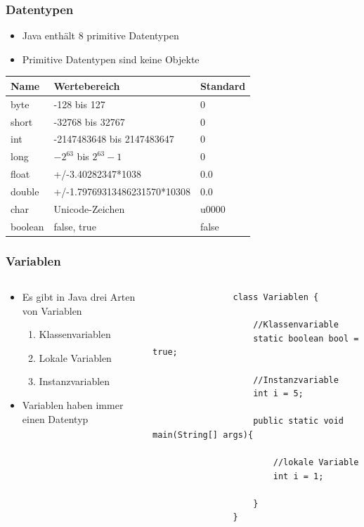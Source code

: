 \begin{frame}[fragile]
	\frametitle{Datentypen}
	\small
	\begin{itemize}
	  \item Java enth\"alt 8 primitive Datentypen
	  \item Primitive Datentypen sind keine Objekte
	\end{itemize}
	\begin{table}
	\begin{tabular}{l|l|l}
	Name & Wertebereich & Standard\\ \hline
	byte  & -128 bis 127 & 0 \\ 
	short & -32768 bis 32767 & 0 \\
			int & -2147483648 bis 2147483647 & 0 \\
			long & $-2^{63}$ bis $2^{63}-1$ & 0 \\
			float & +/-3.40282347*1038 & 0.0 \\
			double & +/-1.79769313486231570*10308 & 0.0 \\
			char & Unicode-Zeichen & u0000 \\
			boolean& false, true & false \\
	\end{tabular}
	\end{table}
	\normalsize
\end{frame}

\begin{frame}[fragile]
	\frametitle{Variablen}
	\begin{columns}
		\begin{column}{0.5\textwidth}
			\small
			\begin{itemize}
				\item Es gibt in Java drei Arten von Variablen
					\begin{enumerate}
					  \item Klassenvariablen
					  \item Lokale Variablen
					  \item Instanzvariablen
					\end{enumerate}
				\item Variablen haben immer einen Datentyp
			\end{itemize}
		\end{column}
		\begin{column}{0.5\textwidth}
			\begin{lstlisting}
				class Variablen {
					
					//Klassenvariable
					static boolean bool = true; 
					
					//Instanzvariable
					int i = 5; 
					
					public static void main(String[] args){ 
						
						//lokale Variable
						int i = 1;
						
					}
				}
			\end{lstlisting}
		\end{column}
	\end{columns}
\end{frame}
 
